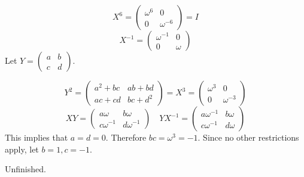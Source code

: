 \begin{solution}
    \[X^6 = \begin{pmatrix} \omega^6 & 0 \\ 0 & \omega^{ - 6} \end{pmatrix} = I\]
    \[X^{ - 1} = \begin{pmatrix} \omega^{ - 1} & 0 \\ 0 & \omega \end{pmatrix}\]
    Let \(Y = \begin{pmatrix} a & b \\ c & d \end{pmatrix}\).

    \[Y^2 = \begin{pmatrix} a^2 + bc & ab + bd \\ ac + cd & bc + d^2  \end{pmatrix} = X^3 = \begin{pmatrix} \omega^3 & 0 \\ 0 & \omega^{ - 3} \end{pmatrix}\]
    \[XY = \begin{pmatrix} a\omega & b\omega \\ c \omega^{ - 1} & d \omega^{ - 1} \end{pmatrix} \quad YX^{ - 1} = \begin{pmatrix} a \omega^{ - 1} & b \omega \\ c \omega^{ - 1} & d \omega \end{pmatrix}\]
    This implies that \(a = d = 0\). Therefore \(bc = \omega^3 = - 1\). Since no other restrictions apply, let \(b = 1, c =- 1\).

    Unfinished.
\end{solution}
